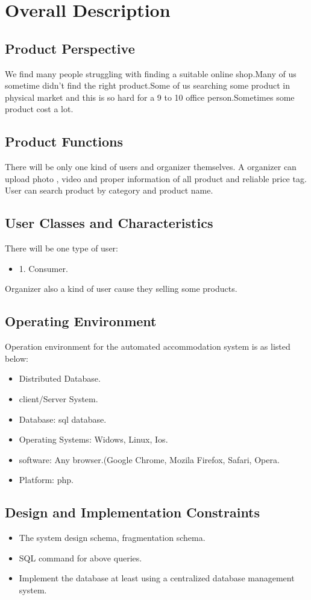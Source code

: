 \documentclass{article}
\begin{document}
\section{Overall Description}
\subsection{Product Perspective}
We find many people struggling with finding a suitable online shop.Many of us sometime didn't find the right product.Some of us searching some product in physical market and this is so hard for a 9 to 10 office person.Sometimes some product cost a lot.
\subsection{Product Functions}
There will be only one kind of users and organizer themselves. A organizer can upload photo , video and proper information of all product and reliable price tag. User can search product by category and product name.
\subsection{User Classes and Characteristics}
There will be one type of user:
\begin{itemize}
\item 1. Consumer.
\end{itemize}
Organizer also a kind of user cause they selling some products.
\subsection{Operating Environment}
Operation environment for the automated accommodation system is as listed below:
\begin{itemize}
\item Distributed Database.
\item client/Server System.
\item Database: sql database.
\item Operating Systems: Widows, Linux, Ios.
\item software: Any browser.(Google Chrome, Mozila Firefox, Safari, Opera.
\item Platform: php.
\end{itemize}
\subsection{Design and Implementation Constraints}
\begin{itemize}
\item The system design schema, fragmentation schema.
\item SQL command for above queries.
\item Implement the database at least using a centralized database management system.
\end{itemize}
\end{document}
